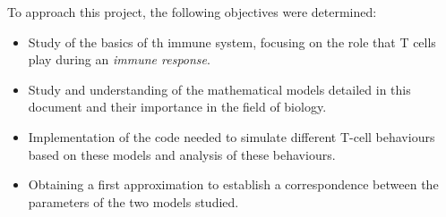To approach this project, the following objectives were determined:

\begin{itemize}
	
	\item Study of the basics of th immune system, focusing on the role that T cells play during an \textit{immune response}.
	
	\item Study and understanding of the mathematical models detailed in this document and their importance in the field of biology.
	
	\item Implementation of the code needed to simulate different T-cell behaviours based on these models and analysis of these behaviours. 
	
	\item Obtaining a first approximation to establish a correspondence between the parameters of the two models studied. 
\end{itemize}







